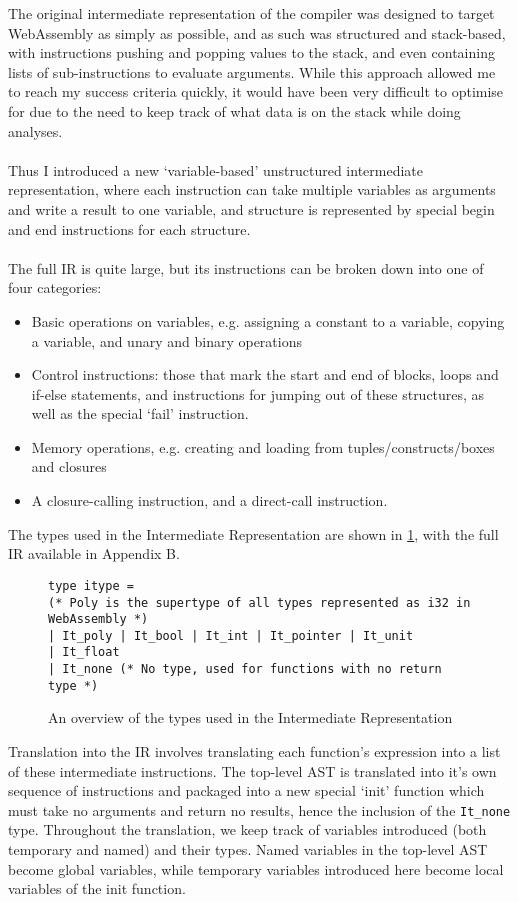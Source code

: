 \documentclass[12pt,twoside,notitlepage]{report}
\newcommand{\camlinline}{\texttt}
\begin{document}
The original intermediate representation of the compiler was designed to target WebAssembly as simply as possible, and as such was structured and stack-based, with instructions pushing and popping values to the stack, and even containing lists of sub-instructions to evaluate arguments. While this approach allowed me to reach my success criteria quickly, it would have been very difficult to optimise for due to the need to keep track of what data is on the stack while doing analyses.
\\\\
Thus I introduced a new `variable-based' unstructured intermediate representation, where each instruction can take multiple variables as arguments and write a result to one variable, and structure is represented by special begin and end instructions for each structure.
\\\\
The full IR is quite large, but its instructions can be broken down into one of four categories:
\begin{itemize}
	\item Basic operations on variables, e.g. assigning a constant to a variable, copying a variable, and unary and binary operations
	\item Control instructions: those that mark the start and end of blocks, loops and if-else statements, and instructions for jumping out of these structures, as well as the special `fail' instruction.
	\item Memory operations, e.g. creating and loading from tuples/constructs/boxes and closures
	\item A closure-calling instruction, and a direct-call instruction.
\end{itemize}
The types used in the Intermediate Representation are shown in \ref{fig:ir}, with the full IR available in Appendix B.
\begin{figure}[h]
	\begin{verbatim}
type itype =
(* Poly is the supertype of all types represented as i32 in WebAssembly *)
| It_poly | It_bool | It_int | It_pointer | It_unit
| It_float
| It_none (* No type, used for functions with no return type *)
	\end{verbatim}
	\caption{An overview of the types used in the Intermediate Representation}
	\label{fig:ir}
\end{figure}
Translation into the IR involves translating each function's expression into a list of these intermediate instructions. The top-level AST is translated into it's own sequence of instructions and packaged into a new special `init' function which must take no arguments and return no results, hence the inclusion of the \camlinline{It_none} type. Throughout the translation, we keep track of variables introduced (both temporary and named) and their types. Named variables in the top-level AST become global variables, while temporary variables introduced here become local variables of the init function.
\end{document}
